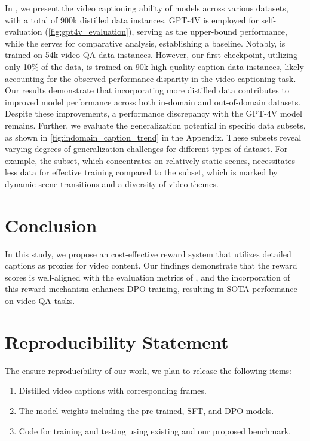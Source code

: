 In , we present the video captioning ability of models across various datasets, with a total of 900k distilled data instances. GPT-4V is employed for self-evaluation (\cref{fig:gpt4v_evaluation}), serving as the upper-bound performance, while the \videollava serves for comparative analysis, establishing a baseline. Notably, \videollava is trained on 54k video QA data instances. However, our first checkpoint, utilizing only 10\% of the data, is trained on 90k high-quality caption data instances, likely accounting for the observed performance disparity in the video captioning task. Our results demonstrate that incorporating more distilled data contributes to improved model performance across both in-domain and out-of-domain datasets. Despite these improvements, a performance discrepancy with the GPT-4V model remains. Further, we evaluate the generalization potential in specific data subsets, as shown in \cref{fig:indomain_caption_trend} in the Appendix. These subsets reveal varying degrees of generalization challenges for different types of dataset. For example, the \webvid subset, which concentrates on relatively static scenes, necessitates less data for effective training compared to the \vidal subset, which is marked by dynamic scene transitions and a diversity of video themes.

\section{Conclusion}
In this study, we propose an cost-effective reward system that utilizes detailed captions as proxies for video content. Our findings demonstrate that the reward scores is well-aligned with the evaluation metrics of \gptv, and the incorporation of this reward mechanism enhances DPO training, resulting in SOTA performance on video QA tasks.

\section{Reproducibility Statement}
The ensure reproducibility of our work, we plan to release the following items:
\begin{enumerate}
    \item Distilled video captions with corresponding frames.
    \item The model weights including the pre-trained, SFT, and DPO models.
    \item Code for training and testing using existing and our proposed benchmark.
\end{enumerate}

\clearpage

